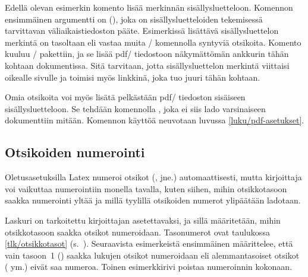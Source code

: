 \noindent
Edellä olevan esimerkin komento  lisää
merkinnän sisällysluetteloon. Komennon ensimmäinen argumentti on
 (), joka on sisällysluetteloiden
tekemisessä tarvittavan väliaikaistiedoston pääte. Esimerkissä lisättävä
sisällysluettelon merkintä on tasoltaan  eli vastaa muita
\-/ komennolla syntyviä otsikoita. Komento
 kuuluu \-/ pakettiin, ja se
lisää pdf\-/ tiedostoon näkymättömän ankkurin tähän kohtaan
dokumentissa. Sitä tarvitaan, jotta sisällysluettelon merkintä viittaisi
oikealle sivulle ja toimisi myös linkkinä, joka tuo juuri tähän kohtaan.

Omia otsikoita voi myös lisätä pelkästään pdf\-/ tiedoston sisäiseen
sisällysluetteloon. Se tehdään komennolla , joka ei
siis lado varsinaiseen dokumenttiin mitään. Komennon käyttöä neuvotaan
luvussa \ref{luku/pdf-asetukset}.

\subsection{Otsikoiden numerointi}
\label{luku/otsikot-numerointi}

Oletusasetuksilla Latex numeroi otsikot (,
 jne.) automaattisesti, mutta kirjoittaja voi vaikuttaa
numerointiin monella tavalla, kuten siihen, mihin otsikkotasoon saakka
numerointi yltää ja millä tyylillä otsikoiden numerot ylipäätään
ladotaan.

Laskuri  on tarkoitettu kirjoittajan asetettavaksi,
ja sillä määritetään, mihin otsikkotasoon saakka otsikot numeroidaan.
Tasonumerot ovat taulukossa \ref{tlk/otsikkotasot}
(s.~\pageref{tlk/otsikkotasot}). Seuraavista esimerkeistä ensimmäinen
määrittelee, että vain tasoon~1 () saakka lukujen
otsikot numeroidaan eli alemmantasoiset otsikot (
ym.) eivät saa numeroa. Toinen esimerkkirivi poistaa numeroinnin
kokonaan.

\begin{koodilohkosis}
\setcounter{secnumdepth}{1}  %
\setcounter{secnumdepth}{-2} %
\end{koodilohkosis}

